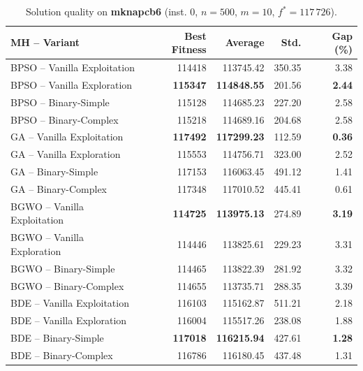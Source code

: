 \begin{table}[htbp]
  \centering
  \small
  \caption{Solution quality on \textbf{mknapcb6} (inst. 0, $n=500$, $m=10$, $f^*=117\,726$).}
  \label{tab:calidad_mknapcb6_0}
  \begin{tabular}{lrrrr}
    \toprule
    \textbf{MH -- Variant} &
    \textbf{Best Fitness} &
    \textbf{Average} &
    \textbf{Std.} &
    \textbf{Gap (\%)} \\
    \midrule
    BPSO -- Vanilla Exploitation &         114418 &        113745.42 & 350.35 &         3.38 \\
    BPSO -- Vanilla Exploration  & \textbf{115347} & \textbf{114848.55} & 201.56 & \textbf{2.44} \\
    BPSO -- Binary-Simple        &         115128 &        114685.23 & 227.20 &         2.58 \\
    BPSO -- Binary-Complex       &         115218 &        114689.16 & 204.68 &         2.58 \\
    \midrule
    GA -- Vanilla Exploitation   & \textbf{117492} & \textbf{117299.23} & 112.59 & \textbf{0.36} \\
    GA -- Vanilla Exploration    &         115553 &        114756.71 & 323.00 &         2.52 \\
    GA -- Binary-Simple          &         117153 &        116063.45 & 491.12 &         1.41 \\
    GA -- Binary-Complex         &         117348 &        117010.52 & 445.41 &         0.61 \\
    \midrule
    BGWO -- Vanilla Exploitation & \textbf{114725} & \textbf{113975.13} & 274.89 & \textbf{3.19} \\
    BGWO -- Vanilla Exploration  &         114446 &        113825.61 & 229.23 &         3.31 \\
    BGWO -- Binary-Simple        &         114465 &        113822.39 & 281.92 &         3.32 \\
    BGWO -- Binary-Complex       &         114655 &        113735.71 & 288.35 &         3.39 \\
    \midrule
    BDE -- Vanilla Exploitation  &         116103 &        115162.87 & 511.21 &         2.18 \\
    BDE -- Vanilla Exploration   &         116004 &        115517.26 & 238.08 &         1.88 \\
    BDE -- Binary-Simple         & \textbf{117018} & \textbf{116215.94} & 427.61 & \textbf{1.28} \\
    BDE -- Binary-Complex        &         116786 &        116180.45 & 437.48 &         1.31 \\
    \bottomrule
  \end{tabular}
\end{table}
